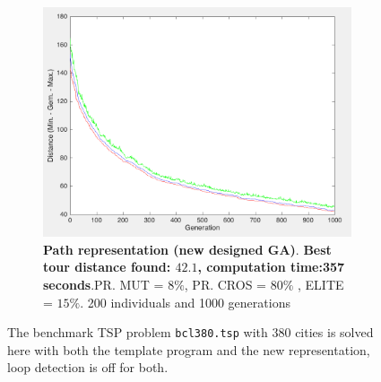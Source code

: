 \begin{figure}[!]
\begin{subfigure}{0.45\textwidth}
  \includegraphics[width=1\textwidth]{../figures/figures_question_4/path_vraag4_off_gen}
      \caption{\textbf{Path representation (new designed GA)}.  \textbf{Best tour distance found: $\mathbf{42.1}$, computation time:357 seconds}.PR. MUT = $8\%$, PR. CROS = $80\%$ , ELITE = $15\%$. 200 individuals and 1000 generations} 
      \label{fig:path_vraag4_off_gen}
\end{subfigure}
\caption{The benchmark TSP problem \texttt{bcl380.tsp} with 380 cities is solved here with both the template program and the new representation, loop detection is off for both.}
\label{fig:tour380_off}
\end{figure}
